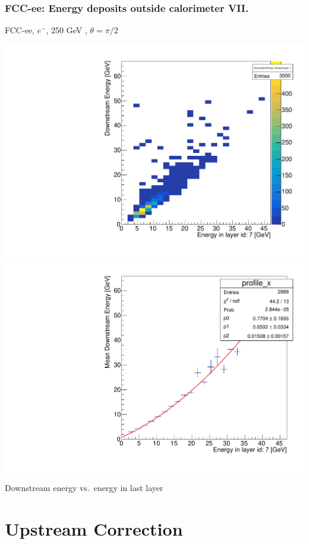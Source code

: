 \documentclass{beamer}
\newcommand{\redtext}[1]{%
  \textcolor{myRed}{#1}
}
\begin{document}
\begin{frame}
  \frametitle{FCC-ee: Energy deposits outside calorimeter VII.}

  \centering
  FCC-ee, $e^{-}$, \redtext{250 GeV}, $\theta = \pi/2$ \\[1.5ex]
  \begin{adjustwidth}{-9mm}{-9mm}
    \includegraphics[width=0.49\linewidth]{figures/downstream/hist_downstream_vs_layer_7_90deg_250GeV.pdf}
    \includegraphics[width=0.49\linewidth]{figures/downstream/profile_downstream_vs_layer_7_90deg_250GeV.pdf}
  \end{adjustwidth}
  \redtext{Downstream} energy vs.\ energy in last layer
\end{frame}


\section{Upstream Correction}
\end{document}
